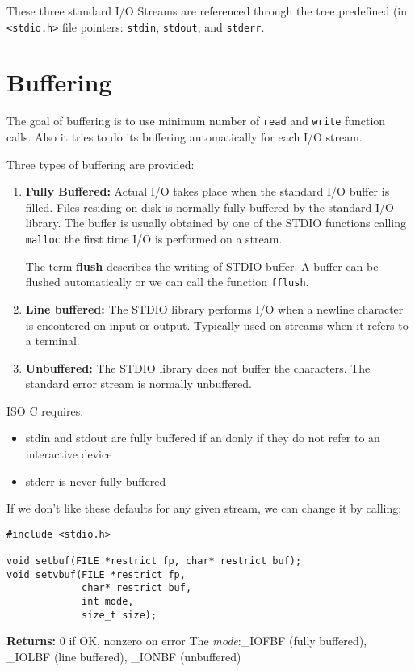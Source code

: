 \documentclass[a4paper,10pt]{book}
\begin{document}
These three standard I/O Streams are referenced through the tree predefined (in
\verb|<stdio.h>| file
pointers: \verb|stdin|, \verb|stdout|, and \verb|stderr|. 

\section{Buffering}
The goal of buffering is to use minimum number of \verb|read| and \verb|write|
function calls. Also it tries to do its buffering automatically for each I/O
stream.

Three types of buffering are provided:
\begin{enumerate}
\item \textbf{Fully Buffered:} Actual I/O takes place when the standard I/O
buffer is filled. Files residing on disk is normally fully buffered by the
standard I/O library. The buffer is usually obtained by one of the STDIO
functions calling \verb|malloc| the first time I/O is performed on a stream.

The term \textbf{flush} describes the writing of STDIO buffer. A buffer can be
flushed automatically or we can call the function \verb|fflush|. 
\item \textbf{Line buffered:} The STDIO library performs I/O when a newline
character is encontered on input or output. Typically used on streams when it
refers to a terminal. 

\item \textbf{Unbuffered:} The STDIO library does not buffer the characters. The
standard error stream is normally unbuffered. 
\end{enumerate}
ISO C requires:
\begin{itemize}
\item stdin and stdout are fully buffered if an donly if they do not refer to an
interactive device
\item stderr is never fully buffered
\end{itemize}
If we don't like these defaults for any given stream, we can change it by
calling: 
\begin{verbatim}
#include <stdio.h>

void setbuf(FILE *restrict fp, char* restrict buf);
void setvbuf(FILE *restrict fp, 
             char* restrict buf, 
             int mode,
             size_t size);
\end{verbatim}
\textbf{Returns:} 0 if OK, nonzero on error
The \emph{mode}:\_IOFBF (fully buffered), \_IOLBF (line buffered), \_IONBF
(unbuffered)
\end{document}
